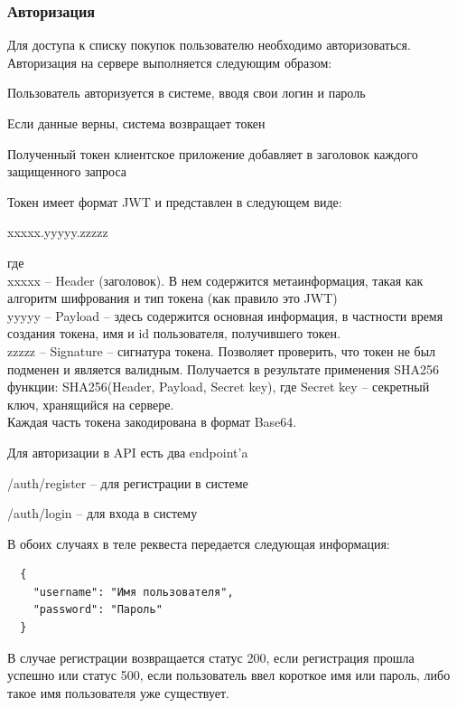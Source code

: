 \subsubsection{Авторизация}
Для доступа к списку покупок пользователю необходимо авторизоваться.
Авторизация на сервере выполняется следующим образом:
\begin{my_enumerate}
  \item Пользователь авторизуется в системе, вводя свои логин и пароль
  \item Если данные верны, система возвращает токен
  \item Полученный токен клиентское приложение добавляет в заголовок
    каждого защищенного запроса
\end{my_enumerate}

Токен имеет формат JWT и представлен в следующем виде:
\begin{center}
  xxxxx.yyyyy.zzzzz
\end{center}
где\\
xxxxx -- Header (заголовок). В нем содержится метаинформация, такая как алгоритм шифрования и тип токена (как правило это JWT)\\
yyyyy -- Payload -- здесь содержится основная информация, в частности время создания токена, имя и id пользователя, получившего токен.\\
zzzzz -- Signature -- сигнатура токена. Позволяет проверить, что токен не был
подменен и является валидным. Получается в результате применения SHA256 функции:
SHA256(Header, Payload, Secret key), где Secret key -- секретный ключ, хранящийся на сервере. \\
Каждая часть токена закодирована в формат Base64.

Для авторизации в API есть два endpoint'a
\begin{my_enumerate}
  \item /auth/register -- для регистрации в системе
  \item /auth/login -- для входа в систему
\end{my_enumerate}

В обоих случаях в теле реквеста передается следующая информация: 
\begin{verbatim}
  {
    "username": "Имя пользователя",
    "password": "Пароль"
  }
\end{verbatim}

В случае регистрации возвращается статус 200, если регистрация прошла успешно
или статус 500, если пользователь ввел короткое имя или пароль, либо такое
имя пользователя уже существует.

